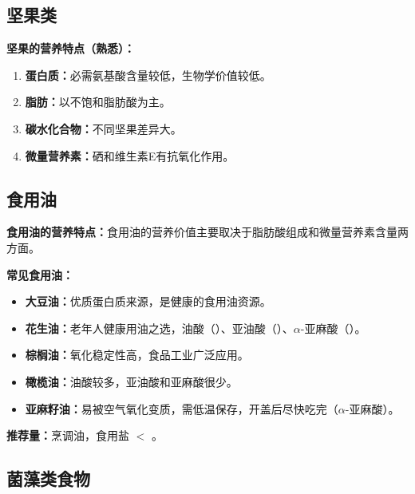 \subsection{坚果类}

\begin{tipbox}
\textbf{坚果的营养特点（熟悉）：}
\begin{enumerate}[leftmargin=*]
    \item \textbf{蛋白质：}必需氨基酸含量较低，生物学价值较低。
    \item \textbf{脂肪：}以不饱和脂肪酸为主。
    \item \textbf{碳水化合物：}不同坚果差异大。
    \item \textbf{微量营养素：}硒和维生素E有抗氧化作用。
\end{enumerate}
\end{tipbox}


\subsection{食用油}

\begin{tipbox}
\textbf{食用油的营养特点：}食用油的营养价值主要取决于脂肪酸组成和微量营养素含量两方面。

\textbf{常见食用油：}
\begin{itemize}[leftmargin=*]
    \item \textbf{大豆油：}优质蛋白质来源，是健康的食用油资源。
    \item \textbf{花生油：}老年人健康用油之选，油酸（）、亚油酸（）、$\alpha$-亚麻酸（）。
    \item \textbf{棕榈油：}氧化稳定性高，食品工业广泛应用。
    \item \textbf{橄榄油：}油酸较多，亚油酸和亚麻酸很少。
    \item \textbf{亚麻籽油：}易被空气氧化变质，需低温保存，开盖后尽快吃完（$\alpha$-亚麻酸）。
\end{itemize}

\textbf{推荐量：}烹调油，食用盐 $<$ 。
\end{tipbox}

\subsection{菌藻类食物}

